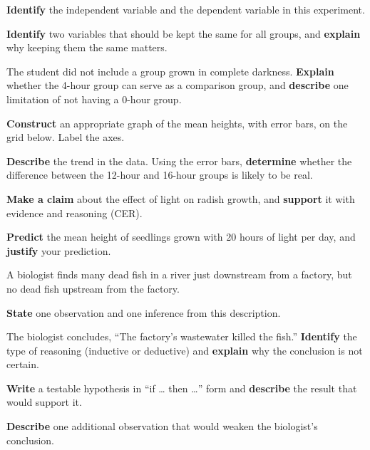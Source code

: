 \documentclass[11pt,letterpaper]{article}
\begin{document}

\begin{parts}
  \item \textbf{Identify} the independent variable and the dependent variable in this experiment.
  \item \textbf{Identify} two variables that should be kept the same for all groups, and \textbf{explain} why keeping them the same matters.
  \item The student did not include a group grown in complete darkness. \textbf{Explain} whether the 4-hour group can serve as a comparison group, and \textbf{describe} one limitation of not having a 0-hour group.
  \item \textbf{Construct} an appropriate graph of the mean heights, with error bars, on the grid below. Label the axes.

  \graphgrid
  \item \textbf{Describe} the trend in the data. Using the error bars, \textbf{determine} whether the difference between the 12-hour and 16-hour groups is likely to be real.
  \item \textbf{Make a claim} about the effect of light on radish growth, and \textbf{support} it with evidence and reasoning (CER).
  \item \textbf{Predict} the mean height of seedlings grown with 20 hours of light per day, and \textbf{justify} your prediction.
\end{parts}


A biologist finds many dead fish in a river just downstream from a factory, but no dead fish upstream from the factory.

\begin{parts}
  \item \textbf{State} one observation and one inference from this description.
  \item The biologist concludes, ``The factory's wastewater killed the fish.'' \textbf{Identify} the type of reasoning (inductive or deductive) and \textbf{explain} why the conclusion is not certain.
  \item \textbf{Write} a testable hypothesis in ``if \dots{} then \dots{}'' form and \textbf{describe} the result that would support it.
  \item \textbf{Describe} one additional observation that would weaken the biologist's conclusion.
\end{parts}
\end{document}
